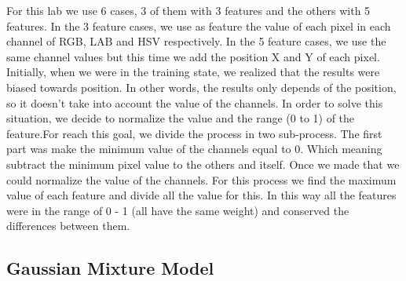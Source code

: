\documentclass[10pt,twocolumn,letterpaper]{article}
\begin{document}
For this lab we use 6 cases, 3 of them with 3 features and the others with 5 features. In the 3 feature cases, we use as feature the value of each pixel in each channel of RGB, LAB and HSV respectively. In the 5 feature cases, we use the same channel values but this time we add the position X and Y of each pixel. \\

Initially, when we were in the training state, we realized that the results were biased towards position. In other words, the results only depends of the position, so it doesn't take into account the value of the channels. In order to solve this situation, we decide to normalize the value and the range (0 to 1) of the feature.For reach this goal, we divide the process in two sub-process. The first part was  make the minimum value of the channels equal to 0. Which meaning subtract the minimum pixel value to the others and itself. Once we made that we could normalize the value of the channels. For this process we find the maximum value of each feature and divide all the value for this. In this way all the features were in the range of 0 - 1 (all have the same weight) and conserved the differences between them. 


\subsection{Gaussian Mixture Model}
\end{document}

